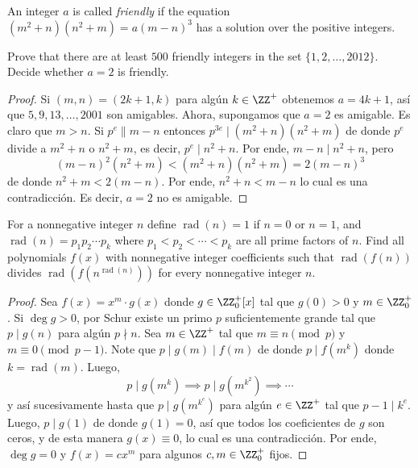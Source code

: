 \begin{probEG}[ISL 2012/N4]
	An integer $a$ is called \emph{friendly} if the equation $(m^2+n)(n^2+m)=a(m-n)^3$ has a solution over the positive integers.
	\begin{enumerate}[(a)]
		\ii Prove that there are at least $500$ friendly integers in the set $\{1,2,\dots,2012\}$.
		\ii Decide whether $a=2$ is friendly.
	\end{enumerate}
\end{probEG}

\begin{proof}
	Si $(m,n)=(2k+1,k)$ para algún $k\in\ZZ^+$ obtenemos $a=4k+1$, así que $5,9,13,\dots,2001$ son amigables. Ahora, supongamos que $a=2$ es amigable. Es claro que $m>n$. Si $p^e\parallel m-n$ entonces $p^{3e}\mid(m^2+n)(n^2+m)$ de donde $p^e$ divide a $m^2+n$ o $n^2+m$, es decir, $p^e\mid n^2+n$. Por ende, $m-n\mid n^2+n$, pero
	\[(m-n)^2(n^2+m)<(m^2+n)(n^2+m)=2(m-n)^3\]
	de donde $n^2+m<2(m-n)$. Por ende, $n^2+n<m-n$ lo cual es una contradicción. Es decir, $a=2$ no es amigable.
\end{proof}

\begin{probEG}[ISL 2012/N5]
	For a nonnegative integer $n$ define $\operatorname{rad}(n)=1$ if $n=0$ or $n=1$, and $\operatorname{rad}(n)=p_1p_2\cdots p_k$ where $p_1<p_2<\cdots<p_k$ are all prime factors of $n$. Find all polynomials $f(x)$ with nonnegative integer coefficients such that $\operatorname{rad}(f(n))$ divides $\operatorname{rad}(f(n^{\operatorname{rad}(n)}))$ for every nonnegative integer $n$.
\end{probEG}

\begin{proof}
	Sea $f(x)=x^m\cdot g(x)$ donde $g\in\ZZ^+_0[x]$ tal que $g(0)>0$ y $m\in\ZZ^+_0$. Si $\deg g>0$, por Schur existe un primo $p$ suficientemente grande tal que $p\mid g(n)$ para algún $p\nmid n$. Sea $m\in\ZZ^+$ tal que $m\equiv n\pmod p$ y $m\equiv 0\pmod{p-1}$. Note que $p\mid g(m)\mid f(m)$ de donde $p\mid f(m^k)$ donde $k=\operatorname{rad}(m)$. Luego,
	\[p\mid g(m^k)\implies p\mid g(m^{k^2})\implies\cdots\]
	y así sucesivamente hasta que $p\mid g(m^{k^e})$ para algún $e\in\ZZ^+$ tal que $p-1\mid k^e$. Luego, $p\mid g(1)$ de donde $g(1)=0$, así que todos los coeficientes de $g$ son ceros, y de esta manera $g(x)\equiv 0$, lo cual es una contradicción. Por ende, $\deg g=0$ y $f(x)=cx^m$ para algunos $c,m\in\ZZ^+_0$ fijos.
\end{proof}

